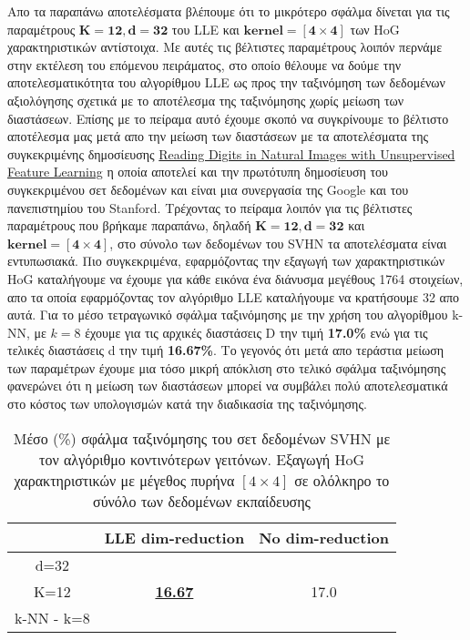 \par
Απο τα παραπάνω αποτελέσματα βλέπουμε ότι το μικρότερο σφάλμα δίνεται για τις παραμέτρους $\mathbf{K=12, d=32}$ του \textlatin{LLE} και $\mathbf{kernel=[4 \times 4]}$ των \textlatin{HoG} χαρακτηριστικών αντίστοιχα. Με αυτές τις βέλτιστες παραμέτρους λοιπόν περνάμε στην εκτέλεση του επόμενου πειράματος, στο οποίο θέλουμε να δούμε την αποτελεσματικότητα του αλγορίθμου \textlatin{LLE} ως προς την ταξινόμηση των δεδομένων αξιολόγησης σχετικά με το αποτέλεσμα της ταξινόμησης χωρίς μείωση των διαστάσεων. Επίσης με το πείραμα αυτό έχουμε σκοπό να συγκρίνουμε το βέλτιστο αποτέλεσμα μας μετά απο την μείωση των διαστάσεων με τα αποτελέσματα της συγκεκριμένης δημοσίευσης \href{http://ufldl.stanford.edu/housenumbers/nips2011\textunderscore housenumbers.pdf}{\textlatin{Reading Digits in Natural Images
with Unsupervised Feature Learning}} \cite{12} η οποία αποτελεί και την πρωτότυπη δημοσίευση του συγκεκριμένου σετ δεδομένων και είναι μια συνεργασία της \textlatin{Google} και του πανεπιστημίου του \textlatin{Stanford}. Τρέχοντας το πείραμα λοιπόν για τις βέλτιστες παραμέτρους που βρήκαμε παραπάνω, δηλαδή $\mathbf{K=12, d=32}$ και $\mathbf{kernel=[4 \times 4]}$, στο σύνολο των δεδομένων του \textlatin{SVHN} τα αποτελέσματα είναι εντυπωσιακά. Πιο συγκεκριμένα, εφαρμόζοντας την εξαγωγή των χαρακτηριστικών \textlatin{HoG} καταλήγουμε να έχουμε για κάθε εικόνα ένα διάνυσμα μεγέθους 1764 στοιχείων, απο τα οποία εφαρμόζοντας τον αλγόριθμο \textlatin{LLE} καταλήγουμε να κρατήσουμε 32 απο αυτά. Για το μέσο τετραγωνικό σφάλμα ταξινόμησης με την χρήση του αλγορίθμου \textlatin{k-NN}, με $k=8$ έχουμε για τις αρχικές διαστάσεις \textlatin{D} την τιμή \textbf{17.0\%} ενώ για τις τελικές διαστάσεις \textlatin{d} την τιμή \textbf{16.67\%}. Το γεγονός ότι μετά απο τεράστια μείωση των παραμέτρων έχουμε μια τόσο μικρή απόκλιση στο τελικό σφάλμα ταξινόμησης φανερώνει ότι η μείωση των διαστάσεων μπορεί να συμβάλει πολύ αποτελεσματικά στο κόστος των υπολογισμών κατά την διαδικασία της ταξινόμησης.

\begin{table}[H]
\singlespacing
\centering
\label{tab:table14}
\caption{Μέσο (\%) σφάλμα ταξινόμησης του σετ δεδομένων \textlatin{SVHN} με τον αλγόριθμο κοντινότερων γειτόνων. Εξαγωγή \textlatin{HoG} χαρακτηριστικών με μέγεθος πυρήνα $[4\times4]$ σε ολόλκηρο το σύνόλο των δεδομένων εκπαίδευσης}
\vspace*{5mm}
\begin{tabular}{|c|c|c|}
\hline
 & LLE dim-reduction & No dim-reduction \\
\hline
d=32 & & \\
K=12 & \underline{\textbf{16.67}} & 17.0 \\
k-NN - k=8 & & \\
\hline
\end{tabular}
\end{table}

